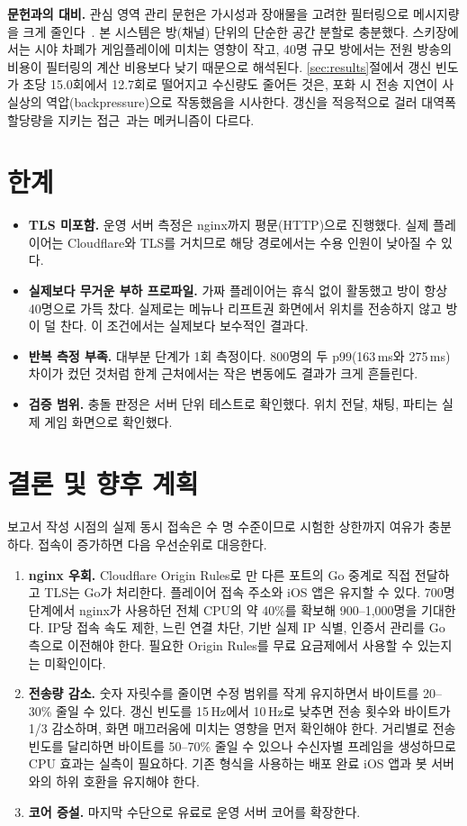 \documentclass[11pt,a4paper]{article}
\begin{document}
\textbf{문헌과의 대비.}
관심 영역 관리 문헌은 가시성과 장애물을 고려한 필터링으로 메시지량을 크게 줄인다~\cite{boulanger_2006_10}. 본 시스템은 방(채널) 단위의 단순한 공간 분할로 충분했다. 스키장에서는 시야 차폐가 게임플레이에 미치는 영향이 작고, 40명 규모 방에서는 전원 방송의 비용이 필터링의 계산 비용보다 낮기 때문으로 해석된다. \ref{sec:results}절에서 갱신 빈도가 초당 15.0회에서 12.7회로 떨어지고 수신량도 줄어든 것은, 포화 시 전송 지연이 사실상의 역압(backpressure)으로 작동했음을 시사한다. 갱신을 적응적으로 걸러 대역폭 할당량을 지키는 접근~\cite{gascon_samson_2015_6}과는 메커니즘이 다르다.
\section{한계}
\label{sec:limits}
\begin{itemize}
  \item \textbf{TLS 미포함.} 운영 서버 측정은 nginx까지 평문(HTTP)으로 진행했다. 실제 플레이어는 Cloudflare와 TLS를 거치므로 해당 경로에서는 수용 인원이 낮아질 수 있다.
  \item \textbf{실제보다 무거운 부하 프로파일.} 가짜 플레이어는 휴식 없이 활동했고 방이 항상 40명으로 가득 찼다. 실제로는 메뉴나 리프트권 화면에서 위치를 전송하지 않고 방이 덜 찬다. 이 조건에서는 실제보다 보수적인 결과다.
  \item \textbf{반복 측정 부족.} 대부분 단계가 1회 측정이다. 800명의 두 p99(163\,ms와 275\,ms) 차이가 컸던 것처럼 한계 근처에서는 작은 변동에도 결과가 크게 흔들린다.
  \item \textbf{검증 범위.} 충돌 판정은 서버 단위 테스트로 확인했다. 위치 전달, 채팅, 파티는 실제 게임 화면으로 확인했다.
\end{itemize}

\section{결론 및 향후 계획}
보고서 작성 시점의 실제 동시 접속은 수 명 수준이므로 시험한 상한까지 여유가 충분하다. 접속이 증가하면 다음 우선순위로 대응한다.

\begin{enumerate}
  \item \textbf{nginx 우회.} Cloudflare Origin Rules로 만 다른 포트의 Go 중계로 직접 전달하고 TLS는 Go가 처리한다. 플레이어 접속 주소와 iOS 앱은 유지할 수 있다. 700명 단계에서 nginx가 사용하던 전체 CPU의 약 40\%를 확보해 900--1,000명을 기대한다. IP당 접속 속도 제한, 느린 연결 차단,  기반 실제 IP 식별, 인증서 관리를 Go 측으로 이전해야 한다. 필요한 Origin Rules를 무료 요금제에서 사용할 수 있는지는 미확인이다.
  \item \textbf{전송량 감소.} 숫자 자릿수를 줄이면 수정 범위를 작게 유지하면서 바이트를 20--30\% 줄일 수 있다. 갱신 빈도를 15\,Hz에서 10\,Hz로 낮추면 전송 횟수와 바이트가 1/3 감소하며, 화면 매끄러움에 미치는 영향을 먼저 확인해야 한다. 거리별로 전송 빈도를 달리하면 바이트를 50--70\% 줄일 수 있으나 수신자별 프레임을 생성하므로 CPU 효과는 실측이 필요하다. 기존 형식을 사용하는 배포 완료 iOS 앱과 봇 서버와의 하위 호환을 유지해야 한다.
  \item \textbf{코어 증설.} 마지막 수단으로 유료로 운영 서버 코어를 확장한다.
\end{enumerate}
\end{document}
